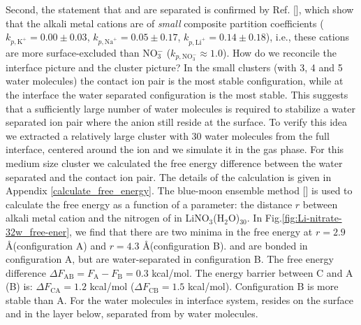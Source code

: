 Second, the statement that \Li and \nitrate are separated is confirmed by Ref. [\cite{Pegram06,Pegram08}],
which show that the alkali metal cations are of \emph{small}
composite partition coefficients ($k_{p,\text{K}^+} = 0.00\pm 0.03$, $k_{p,\text{Na}^+} = 0.05\pm 0.17$, $k_{p,\text{Li}^+} = 0.14\pm 0.18$), i.e., 
these cations are more surface-excluded than 
NO$_3^-$ ($k_{p,\text{NO}_3^-} \approx 1.0$).
How do we reconcile the interface picture and the cluster picture?
In the small clusters (with 3, 4 and 5 water molecules) the contact ion pair is the most stable configuration, 
while at the interface the water separated configuration is the most stable.
This suggests that a sufficiently large number of water molecules is required to stabilize a water separated ion pair where
the \nitrate anion still reside at the surface. 
To verify this idea we extracted a relatively large cluster with 30 water molecules from the full interface, centered
around the \Li ion and we simulate it in the gas phase. 
For this medium size cluster we calculated the free energy difference between the
water separated and the contact ion pair. The details of the calculation is given in Appendix \ref{calculate_free_energy}. 
The blue-moon ensemble method [\cite{CCHK89,Sprik98,Tuckerman10}] is used to calculate the free energy as a function of a parameter: 
the distance $r$ between alkali metal cation and the nitrogen of \nitrate in LiNO$_3$(H$_2$O)$_{30}$.
In Fig.\space\ref{fig:Li-nitrate-32w_free-ener}, we find that there are two minima in the free energy
at $r=2.9$ \AA (configuration A)  and $r=4.3$ \AA(configuration B).
\Li and \nitrate are bonded in configuration A, but are water-separated in configuration B.
The free energy difference $\Delta{F}_{\text{AB}}=F_{\text{A}}-F_{\text{B}} = 0.3$ kcal/mol. 
The energy barrier between C and A (B) is:
$\Delta{F_{\text{CA}}} = 1.2$ kcal/mol ($\Delta F_{\text{CB}} = 1.5$ kcal/mol). Configuration B is more stable than A.
For the water molecules in interface system, \nitrate resides on the surface and \Li in the layer below, separated from \nitrate by water molecules.
